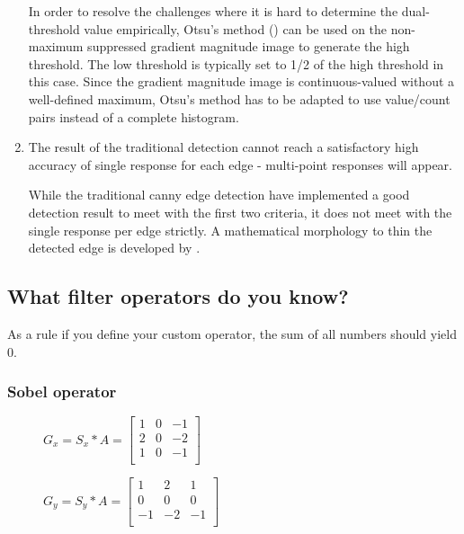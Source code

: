 \begin{enumerate}
    In order to resolve the challenges where it is hard to determine the dual-threshold value empirically, Otsu's method (\cite{otsu78}) can be used on the non-maximum suppressed gradient magnitude image to generate the high threshold. The low threshold is typically set to 1/2 of the high threshold in this case. Since the gradient magnitude image is continuous-valued without a well-defined maximum, Otsu's method has to be adapted to use value/count pairs instead of a complete histogram.

    \item The result of the traditional detection cannot reach a satisfactory high accuracy of single response for each edge - multi-point responses will appear.

    While the traditional canny edge detection have implemented a good detection result to meet with the first two criteria, it does not meet with the single response per edge strictly. A mathematical morphology to thin the detected edge is developed by \cite{zhong92}.
\end{enumerate}




\subsection{What filter operators do you know?}
As a rule if you define your custom operator, the sum of all numbers should yield 0.
\subsubsection{Sobel operator}

\begin{figure}[!htb]
    \centering
    \begin{minipage}{.5\textwidth}
        \centering
        $G_{x} = S_{x} * A =
        \left[ \begin{array}{rrr}
        1 & 0 & -1 \\
        2 & 0 & -2 \\
        1 & 0 & -1 \\
        \end{array}\right] $
    \end{minipage}%
    \begin{minipage}{.5\textwidth}
        \centering
        $G_{y} = S_{y} * A =
        \left[ \begin{array}{rrr}
        1 & 2 & 1 \\
        0 & 0 & 0 \\
        -1 & -2 & -1 \\
        \end{array}\right] $
    \end{minipage}
\end{figure}


